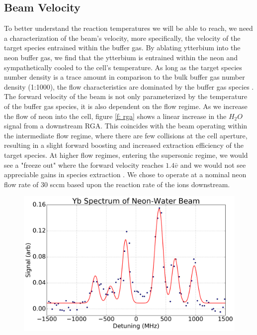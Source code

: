 \subsection{Beam Velocity}

To better understand the reaction temperatures we will be able to reach, we need a characterization of the beam's velocity, more specifically, the velocity of the target species entrained within the buffer gas. By ablating ytterbium into the neon buffer gas, we find that the ytterbium is entrained within the neon and sympathetically cooled to the cell's temperature. As long as the target species number density is a trace amount in comparison to the bulk buffer gas number density (1:1000), the flow characteristics are dominated by the buffer gas species \cite{Hutzler2012}. The forward velocity of the beam is not only parameterized by the temperature of the buffer gas species, it is also dependent on the flow regime. As we increase the flow of neon into the cell, figure \ref{f: rga} shows a linear increase in the $H_2O$ signal from a downstream RGA. This coincides with the beam operating within the intermediate flow regime, where there are few collisions at the cell aperture, resulting in a slight forward boosting and increased extraction efficiency of the target species. At higher flow regimes, entering the supersonic regime, we would see a "freeze out" where the forward velocity reaches $1.4\bar{v}$ and we would not see appreciable gains in species extraction \cite{Hutzler2012}. We chose to operate at a nominal neon flow rate of 30 sccm based upon the reaction rate of the ions downstream.

\begin{figure}[H]
\centering
\includegraphics[width=1\textwidth]{images/CBGB_yb_spectrum_long.png}
\caption{\label{f: yb_spectrum}}
\end{figure}